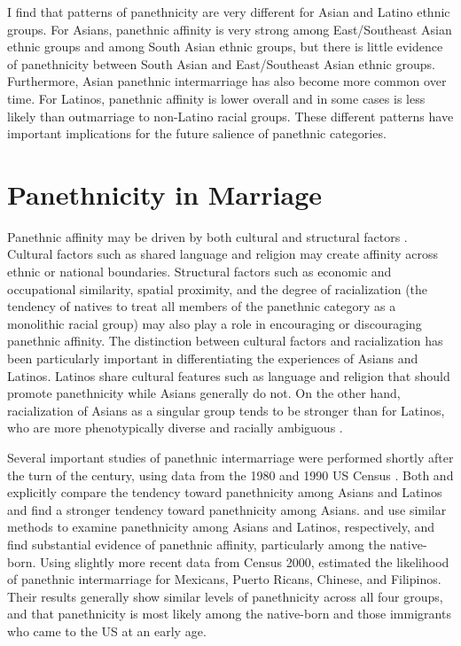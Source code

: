 \documentclass[11pt,]{article}
\begin{document}
I find that patterns of panethnicity are very different for Asian and Latino ethnic groups. For Asians, panethnic affinity is very strong among East/Southeast Asian ethnic groups and among South Asian ethnic groups, but there is little evidence of panethnicity between South Asian and East/Southeast Asian ethnic groups. Furthermore, Asian panethnic intermarriage has also become more common over time. For Latinos, panethnic affinity is lower overall and in some cases is less likely than outmarriage to non-Latino racial groups. These different patterns have important implications for the future salience of panethnic categories.

\hypertarget{panethnicity-in-marriage}{%
\section{Panethnicity in Marriage}\label{panethnicity-in-marriage}}

Panethnic affinity may be driven by both cultural and structural factors \citep{lopez_panethnicity_1990}. Cultural factors such as shared language and religion may create affinity across ethnic or national boundaries. Structural factors such as economic and occupational similarity, spatial proximity, and the degree of racialization (the tendency of natives to treat all members of the panethnic category as a monolithic racial group) may also play a role in encouraging or discouraging panethnic affinity. The distinction between cultural factors and racialization has been particularly important in differentiating the experiences of Asians and Latinos. Latinos share cultural features such as language and religion that should promote panethnicity while Asians generally do not. On the other hand, racialization of Asians as a singular group tends to be stronger than for Latinos, who are more phenotypically diverse and racially ambiguous \citep{lopez_panethnicity_1990, kibria_construction_1997, qian_latinos_2004}.

Several important studies of panethnic intermarriage were performed shortly after the turn of the century, using data from the 1980 and 1990 US Census \citep{qian_asian_2001, rosenfeld_salience_2001, qian_latinos_2004, fu_how_2007a}. Both \citet{rosenfeld_salience_2001} and \citet{fu_how_2007a} explicitly compare the tendency toward panethnicity among Asians and Latinos and find a stronger tendency toward panethnicity among Asians. \citet{qian_asian_2001} and \citet{qian_latinos_2004} use similar methods to examine panethnicity among Asians and Latinos, respectively, and find substantial evidence of panethnic affinity, particularly among the native-born. Using slightly more recent data from Census 2000, \citet{qian_crossing_2012} estimated the likelihood of panethnic intermarriage for Mexicans, Puerto Ricans, Chinese, and Filipinos. Their results generally show similar levels of panethnicity across all four groups, and that panethnicity is most likely among the native-born and those immigrants who came to the US at an early age.
\end{document}
